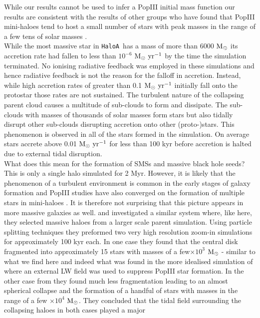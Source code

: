 \documentclass[twocolumn,iop,revtex4]{openjournal}
\newcommand{\msolar} {$\rm{M_{\odot}}~$}
\newcommand{\msolarc} {$\rm{M_{\odot}}$}
\newcommand{\msolaryr} {$\rm{M_{\odot}~yr^{-1}}~$}
\newcommand{\ha} {\texttt{HaloA~}}
\begin{document}
While our results cannot be used to infer a PopIII initial mass function our results
are consistent with the results of other groups who have found that PopIII mini-haloes
tend to host a small number of stars with peak masses in the range of a few tens of
solar masses \citep{Hirano_2014, Susa_2014, Stacy_2016, Skinner_2020}.\\
\indent While the most massive star in \ha has a mass of more than 6000 \msolar its accretion rate had fallen
to less than $10^{-6}$ \msolaryr by the time the simulation terminated. No ionising radiative
feedback was employed in these simulations and hence radiative feedback is not the reason for
the falloff in accretion. Instead, while high accretion rates of greater than 0.1 \msolaryr initially
fall onto the protostar those rates are not sustained. The turbulent nature of the collapsing parent
cloud causes a multitude of sub-clouds to form and dissipate. The sub-clouds with masses of
thousands of solar masses form stars but also tidally disrupt other sub-clouds disrupting
accretion onto other (proto-)stars. This phenomenon is observed in all of the stars formed in the simulation.
On average stars accrete above 0.01 \msolaryr for less than 100 kyr before accretion is halted
due to external tidal disruption. \\
\indent What does this mean for the formation of SMSs and massive black hole seeds? This is only a
single halo simulated for 2 Myr. However, it is likely that the phenomenon of a
turbulent environment is common in the early stages of galaxy formation and
PopIII studies have also converged on the formation of multiple stars in mini-haloes
\citep[e.g.][]{Turk_2012}. It is therefore not surprising that this picture appears in
more massive galaxies as well. \cite{Chon_2016} and \cite{Chon_2017b} investigated a similar system
where, like here, they selected massive haloes from a larger scale parent simulation. Using
particle splitting techniques they preformed two very high resolution zoom-in simulations for
approximately 100 kyr each. In one case they found that the central disk fragmented into approximately
15 stars with masses of a few$\times 10^3$ \msolar - similar to what we find here
and indeed what was found in the more idealised simulation of \cite{Regan_2018b} where an external LW field was used to suppress PopIII star formation. In the
other case from \cite{Chon_2017b} they found much less fragmentation leading to an almost spherical collapse and the
formation of a handful of stars with masses in the range of a few $\times 10^4$ \msolarc.
They concluded that the tidal field surrounding the collapsing haloes in both cases played a major
\end{document}

